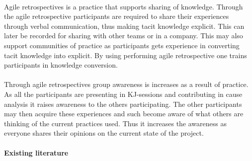 \documentclass{article}
\begin{document}
\paragraph{}
Agile retrospectives is a practice that supports sharing of knowledge. Through the agile retrospective participants are required to share their experiences through verbal communication, thus making tacit knowledge explicit. This can later be recorded for sharing with other teams or in a company. This may also support communities of practice as participants gets experience in converting tacit knowledge into explicit. By using performing agile retrospective one trains participants in knowledge conversion. 

\paragraph{}
Through agile retrospectives group awareness is increases as a result of practice. As all the participants are presenting in KJ-sessions and contributing in cause analysis it raises awareness to the others participating. The other participants may then acquire these experiences and such become aware of what others are thinking of the current practices used. Thus it increases the awareness as everyone shares their opinions on the current state of the project.
 
\paragraph{Existing literature}
\end{document}
